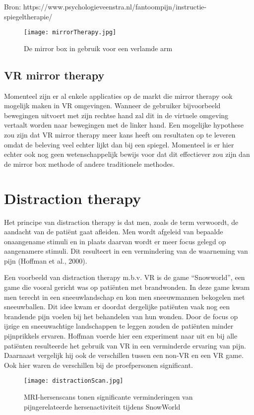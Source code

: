 Bron: https://www.psychologieveenstra.nl/fantoompijn/instructie-spiegeltherapie/


\begin{figure}[h]
    \centering
    \texttt{[image: mirrorTherapy.jpg]}
    \caption{De mirror box in gebruik voor een verlamde arm}
\end{figure}

\subsection{VR mirror therapy}
Momenteel zijn er al enkele applicaties op de markt die mirror therapy ook mogelijk maken in VR omgevingen. Wanneer de gebruiker bijvoorbeeld bewegingen uitvoert met zijn rechtse hand zal dit in de virtuele omgeving vertaalt worden naar bewegingen met de linker hand. Een mogelijke hypothese zou zijn dat VR mirror therapy meer kans heeft om resultaten op te leveren omdat de beleving veel echter lijkt dan bij een spiegel. Momenteel is er hier echter ook nog geen wetenschappelijk bewijs voor dat dit effectiever zou zijn dan de mirror box methode of andere traditionele methodes. 

\section{Distraction therapy}
Het principe van distraction therapy is dat men, zoals de term verwoordt, de aandacht van de patiënt gaat afleiden. Men wordt afgeleid van bepaalde onaangename stimuli en in plaats daarvan wordt er meer focus gelegd op aangenamere stimuli. Dit resulteert in een vermindering van de waarneming van pijn (Hoffman et al., 2000). 

Een voorbeeld van distraction therapy m.b.v. VR is de game “Snowworld”, een game die vooral gericht was op patiënten met brandwonden. In deze game kwam men terecht in een sneeuwlandschap en kon men sneeuwmannen bekogelen met sneeuwballen. Dit idee kwam er doordat dergelijke patiënten vaak nog een brandende pijn voelen bij het behandelen van hun wonden. Door de focus op ijzige en sneeuwachtige landschappen te leggen zouden de patiënten minder pijnprikkels ervaren.
Hoffman voerde hier een experiment naar uit en bij alle patiënten resulteerde het gebruik van VR in een verminderde ervaring van pijn. Daarnaast vergelijk hij ook de verschillen tussen een non-VR en een VR game. Ook hier waren de verschillen bij de proefpersonen significant.

\begin{figure}[h]
    \centering
    \texttt{[image: distractionScan.jpg]}
    \caption{MRI-hersenscans tonen significante verminderingen van pijngerelateerde hersenactiviteit tijdens SnowWorld}
\end{figure}

